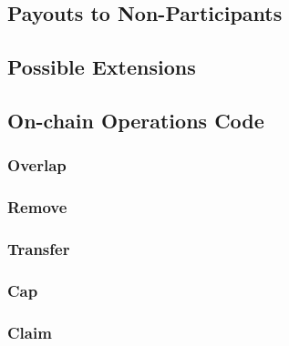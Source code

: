 \documentclass{article}
\theoremstyle{definition}
\begin{document}
\subsection{Payouts to Non-Participants}
\subsection{Possible Extensions}

\subsection{On-chain Operations Code}
\subsubsection{Overlap}
\begin{minipage}{\linewidth} %
  
\end{minipage}

\subsubsection{Remove}
\begin{minipage}{\linewidth} %
  
\end{minipage}

\subsubsection{Transfer}
\begin{minipage}{\linewidth} %
  
\end{minipage}

\subsubsection{Cap}\label{appendix:cap}
\begin{minipage}{\linewidth} %
  
\end{minipage}

\subsubsection{Claim}\label{appendix:claim}
\begin{minipage}{\linewidth} %
  
\end{minipage}
\end{document}
